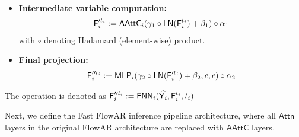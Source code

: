 \begin{definition}
\begin{itemize}
\begin{align*}
    \end{align*}
    \item {\bf Intermediate variable computation:}
    \begin{align*}
        \mathsf{F}'^{t_i}_i:= \mathsf{AAttC}_i (\gamma_1 \circ \mathsf{LN}(\mathsf{F}_i^{t_i}) + \beta_1) \circ \alpha_1
    \end{align*}
    with $\circ$ denoting Hadamard (element-wise) product.
    \item {\bf Final projection:}
    \begin{align*}
        \mathsf{F}''^{t_i}_i := \mathsf{MLP}_i(\gamma_2 \circ \mathsf{LN}(\mathsf{F}'^{t_i}_i)+ \beta_2,c,c) \circ \alpha_2
    \end{align*}
\end{itemize}
The operation is denoted as $\mathsf{F}''^{t_i}_i := \mathsf{FNN}_i(\widehat{\mathsf{Y}_i},\mathsf{F}_i^{t_i},t_i)$
\end{definition}


Next, we define the Fast FlowAR inference pipeline architecture, where all 
$\mathsf{Attn}$ layers in the original FlowAR architecture are replaced with $\mathsf{AAttC}$ layers.




